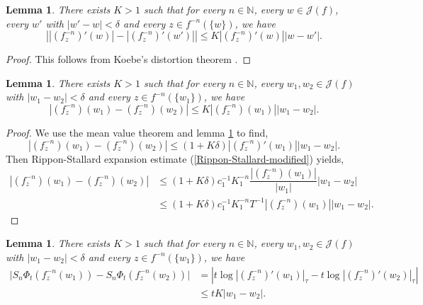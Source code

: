 \documentclass[12pt,reqno]{amsart}
\newtheorem{lemma}[theorem]{Lemma}
\begin{document}
\begin{lemma}\label{Koebe f'}
    There exists $K>1$ such that for every $n \in \mathbb{N}$, every $w\in \mathcal{J}(f)$, every $w'$ with $|w'-w| < \delta$ and every $z \in f^{-n}(\{ w\})$, we have
   $$\left|\left|(f^{-n}_z)'(w)\right| - \left|(f^{-n}_z)'(w')\right|\right|\leq K\left|(f^{-n}_z)'(w)\right||w-w'|.$$
\end{lemma}
\begin{proof}
    This follows from Koebe's distortion theorem \citep[p. 287]{MeromorphicDynamics}.
\end{proof}
\begin{lemma}\label{Koebe f}
    There exists $K>1$ such that for every $n \in \mathbb{N}$, every $w_1,w_2 \in \mathcal{J}(f)$ with $|w_1-w_2| < \delta$ and every $z \in f^{-n}(\{ w_1\})$, we have
    $$\left|(f_z^{-n})(w_1)-(f_z^{-n})(w_2)\right|\leq K|(f_z^{-n})(w_1)||w_1-w_2|.$$
\end{lemma}
\begin{proof}
    We use the mean value theorem and lemma \ref{Koebe f'} to find,
    $$\left|(f_z^{-n})(w_1)-(f_z^{-n})(w_2)\right|\leq (1+K\delta)|(f_z^{-n})'(w_1)||w_1-w_2|.$$
    Then Rippon-Stallard expansion estimate (\ref{Rippon-Stallard-modified}) yields,
    \begin{align*}
        \left|(f_z^{-n})(w_1)-(f_z^{-n})(w_2)\right|&\leq (1+K\delta)c_1^{-1}K_1^{-n}\dfrac{|(f_z^{-n})(w_1)|}{|w_1|} |w_1-w_2|\\
        & \leq (1+K\delta)c_1^{-1}K_1^{-n} T^{-1}|(f_z^{-n})(w_1)||w_1-w_2|.
    \end{align*}
\end{proof}
    \begin{lemma}\label{Ionescu S_n}
        There exists $K>1$ such that for every $n \in \mathbb{N}$, every $w_1,w_2 \in \mathcal{J}(f)$ with $|w_1-w_2|<\delta$ and  
        every $z \in f^{-n}(\{w_1 \})$, we have
        \begin{align*}
            \big| S_n\Phi_t\left(f^{-n}_z(w_1)\right) -S_n\Phi_t\left(f^{-n}_z(w_2)\right) \big| &= \left|t\log\left|(f_z^{-n})'(w_1)\right|_{\tau} - t\log\left|(f_z^{-n})'(w_2)\right|_{\tau}\right|\\
            & \leq tK|w_1-w_2|.
        \end{align*}
    \end{lemma}
\end{document}
